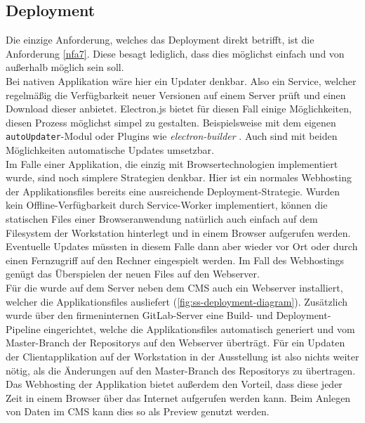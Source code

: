 \subsection{Deployment}
\label{subs:deployment}

Die einzige Anforderung, welches das Deployment direkt betrifft, ist die Anforderung
\ref{nfa7}. Diese besagt lediglich, dass dies möglichst einfach und von außerhalb möglich
sein soll.\\
Bei nativen Applikation wäre hier ein Updater denkbar. Also ein Service,
welcher regelmäßig die Verfügbarkeit neuer Versionen auf einem Server prüft und einen Download 
dieser anbietet. Electron.js bietet für diesen Fall einige Möglichkeiten, diesen Prozess 
möglichst simpel zu gestalten. Beispielsweise mit dem eigenen 
\texttt{autoUpdater}-Modul \cite{electron-autoUpdater} oder Plugins wie 
\emph{electron-builder} \cite{electron-builder}. Auch sind mit beiden Möglichkeiten
automatische Updates umsetzbar.\\
Im Falle einer Applikation, die einzig mit Browsertechnologien implementiert wurde, sind 
noch simplere Strategien denkbar. Hier ist ein normales Webhosting der Applikationsfiles 
bereits eine ausreichende Deployment-Strategie. Wurden kein Offline-Verfügbarkeit durch
Service-Worker implementiert, können die statischen Files einer Browseranwendung natürlich
auch einfach auf dem Filesystem der Workstation hinterlegt und in einem Browser aufgerufen 
werden. Eventuelle Updates müssten in diesem Falle dann aber wieder vor Ort oder durch einen
Fernzugriff auf den Rechner eingespielt werden. Im Fall des Webhostings genügt das Überspielen
der neuen Files auf den Webserver.\\

Für die \shst{} wurde auf dem Server neben dem CMS auch ein Webserver installiert, welcher die 
Applikationsfiles ausliefert (\autoref{fig:ss-deployment-diagram}). Zusätzlich wurde über den 
firmeninternen GitLab-Server \cite{gitlab} eine Build- und Deployment-Pipeline eingerichtet, welche die 
Applikationsfiles automatisch generiert und vom Master-Branch der Repositorys auf den Webserver überträgt. 
Für ein Updaten der Clientapplikation auf der Workstation in der Ausstellung ist also nichts weiter 
nötig, als die Änderungen auf den Master-Branch des Repositorys zu übertragen.\\
Das Webhosting der Applikation bietet außerdem den Vorteil, dass diese jeder Zeit in einem Browser 
über das Internet aufgerufen werden kann. Beim Anlegen von Daten im CMS kann dies so als
Preview genutzt werden.